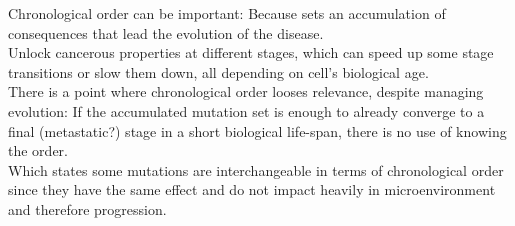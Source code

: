 Chronological order can be important:
Because sets an accumulation of consequences that lead the evolution of the disease.
\\

Unlock cancerous properties at different stages, which can speed up some stage transitions or slow them down, all depending on cell’s biological age.
\\
There is a point where chronological order looses relevance, despite managing evolution: If the accumulated mutation set is enough to already converge to a final (metastatic?) stage in a short biological life-span, there is no use of knowing the order.
\\

Which states some mutations are interchangeable in terms of chronological order since they have the same effect and do not impact heavily in microenvironment and therefore progression.
